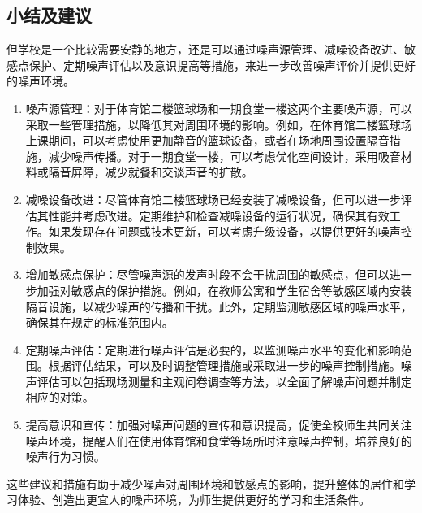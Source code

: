 \subsection{小结及建议}
但学校是一个比较需要安静的地方，还是可以通过噪声源管理、减噪设备改进、敏感点保护、定期噪声评估以及意识提高等措施，来进一步改善噪声评价并提供更好的噪声环境。
\begin{enumerate}
    \item 噪声源管理：对于体育馆二楼篮球场和一期食堂一楼这两个主要噪声源，可以采取一些管理措施，以降低其对周围环境的影响。例如，在体育馆二楼篮球场上课期间，可以考虑使用更加静音的篮球设备，或者在场地周围设置隔音措施，减少噪声传播。对于一期食堂一楼，可以考虑优化空间设计，采用吸音材料或隔音屏障，减少就餐和交谈声音的扩散。
    \item 减噪设备改进：尽管体育馆二楼篮球场已经安装了减噪设备，但可以进一步评估其性能并考虑改进。定期维护和检查减噪设备的运行状况，确保其有效工作。如果发现存在问题或技术更新，可以考虑升级设备，以提供更好的噪声控制效果。
    \item 增加敏感点保护：尽管噪声源的发声时段不会干扰周围的敏感点，但可以进一步加强对敏感点的保护措施。例如，在教师公寓和学生宿舍等敏感区域内安装隔音设施，以减少噪声的传播和干扰。此外，定期监测敏感区域的噪声水平，确保其在规定的标准范围内。
    \item 定期噪声评估：定期进行噪声评估是必要的，以监测噪声水平的变化和影响范围。根据评估结果，可以及时调整管理措施或采取进一步的噪声控制措施。噪声评估可以包括现场测量和主观问卷调查等方法，以全面了解噪声问题并制定相应的对策。
    \item 提高意识和宣传：加强对噪声问题的宣传和意识提高，促使全校师生共同关注噪声环境，提醒人们在使用体育馆和食堂等场所时注意噪声控制，培养良好的噪声行为习惯。
\end{enumerate}

这些建议和措施有助于减少噪声对周围环境和敏感点的影响，提升整体的居住和学习体验、创造出更宜人的噪声环境，为师生提供更好的学习和生活条件。

